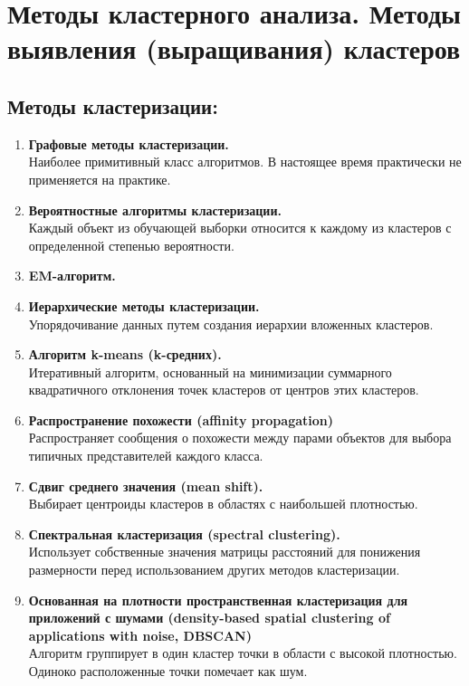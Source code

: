 \documentclass[11pt]{article}
\begin{document}
\tableofcontents

\section{Методы кластерного анализа. Методы выявления (выращивания) кластеров}

\subsection{Методы кластеризации:}

\begin{enumerate}
    \item \textbf{Графовые методы кластеризации.} \\
    Наиболее примитивный класс алгоритмов. В настоящее время практически не применяется на практике.
    
    \item \textbf{Вероятностные алгоритмы кластеризации.} \\
    Каждый объект из обучающей выборки относится к каждому из кластеров с определенной степенью вероятности.
    
    \item \textbf{EM-алгоритм.}
    
    \item \textbf{Иерархические методы кластеризации.} \\
    Упорядочивание данных путем создания иерархии вложенных кластеров.
    
    \item \textbf{Алгоритм k-means (k-средних).} \\
    Итеративный алгоритм, основанный на минимизации суммарного квадратичного отклонения точек кластеров от центров этих кластеров.
    
    \item \textbf{Распространение похожести (affinity propagation)} \\
    Распространяет сообщения о похожести между парами объектов для выбора типичных представителей каждого класса.
    
    \item \textbf{Сдвиг среднего значения (mean shift).} \\
    Выбирает центроиды кластеров в областях с наибольшей плотностью.
    
    \item \textbf{Спектральная кластеризация (spectral clustering).} \\
    Использует собственные значения матрицы расстояний для понижения размерности перед использованием других методов кластеризации.
    
    \item \textbf{Основанная на плотности пространственная кластеризация для приложений с шумами (density-based spatial clustering of applications with noise, DBSCAN)} \\
    Алгоритм группирует в один кластер точки в области с высокой плотностью. Одиноко расположенные точки помечает как шум.
\end{enumerate}
\end{document}
